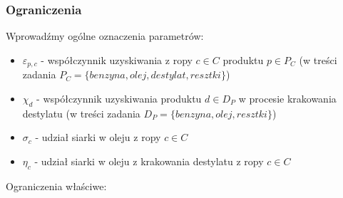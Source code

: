\documentclass{article}
\begin{document}
\subsubsection{Ograniczenia}
Wprowadźmy ogólne oznaczenia parametrów:
\begin{itemize}
    \item $\varepsilon_{p, c}$ - współczynnik uzyskiwania z ropy $c\in C$  produktu $p\in P_C$ (w treści zadania $P_C=\{benzyna, olej, destylat, resztki\}$) 
    \item $\chi_{d}$ - współczynnik uzyskiwania produktu $d\in D_P$ w procesie krakowania destylatu (w treści zadania $D_P=\{benzyna, olej, resztki\}$) 
    \item $\sigma_{c}$ - udział siarki w oleju z ropy $c\in C$
    \item $\eta_c$     - udział siarki w oleju z krakowania destylatu z ropy $c\in C$
    
\end{itemize}
Ograniczenia właściwe:
\end{document}
